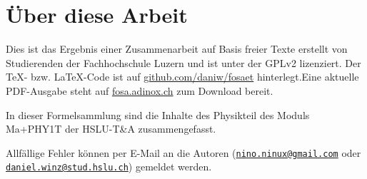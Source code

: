 



\chapter*{Über diese Arbeit}
Dies ist das Ergebnis einer Zusammenarbeit auf Basis freier Texte erstellt von Studierenden der Fachhochschule Luzern und ist unter der GPLv2 lizenziert. Der \TeX - bzw. \LaTeX -Code ist auf \url{github.com/daniw/fosaet} hinterlegt.Eine aktuelle PDF-Ausgabe steht auf \url{fosa.adinox.ch} zum Download bereit.

In dieser Formelsammlung sind die Inhalte des Physikteil des Moduls Ma+PHY1T der HSLU-T\&A zusammengefasst. 

Allfällige Fehler können per E-Mail an die Autoren 
(\href{mailto:nino.ninux@gmail.com}{\nolinkurl{nino.ninux@gmail.com}} oder 
\href{mailto:daniel.winz@stud.hslu.ch}{\nolinkurl{daniel.winz@stud.hslu.ch}}) 
gemeldet werden. 
